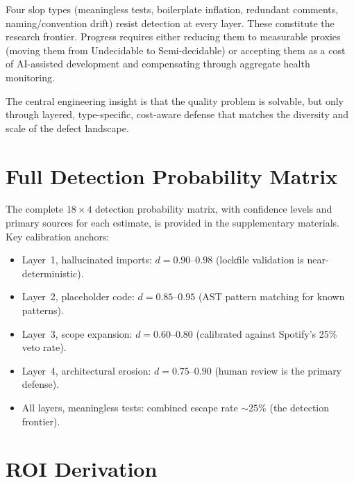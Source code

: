 \documentclass[11pt, a4paper]{article}
\theoremstyle{definition}
\theoremstyle{remark}
\begin{document}
Four slop types (meaningless tests, boilerplate inflation, redundant comments, naming/convention drift) resist detection at every layer. These constitute the research frontier. Progress requires either reducing them to measurable proxies (moving them from Undecidable to Semi-decidable) or accepting them as a cost of AI-assisted development and compensating through aggregate health monitoring.

The central engineering insight is that the quality problem is solvable, but only through layered, type-specific, cost-aware defense that matches the diversity and scale of the defect landscape.





\appendix

\section{Full Detection Probability Matrix}
\label{app:matrix}

The complete $18 \times 4$ detection probability matrix, with confidence levels and primary sources for each estimate, is provided in the supplementary materials. Key calibration anchors:

\begin{itemize}[leftmargin=2em]
\item Layer~1, hallucinated imports: $d = 0.90$--$0.98$ (lockfile validation is near-deterministic).
\item Layer~2, placeholder code: $d = 0.85$--$0.95$ (AST pattern matching for known patterns).
\item Layer~3, scope expansion: $d = 0.60$--$0.80$ (calibrated against Spotify's 25\% veto rate).
\item Layer~4, architectural erosion: $d = 0.75$--$0.90$ (human review is the primary defense).
\item All layers, meaningless tests: combined escape rate ${\sim}25\%$ (the detection frontier).
\end{itemize}

\section{ROI Derivation}
\label{app:roi}
\end{document}
